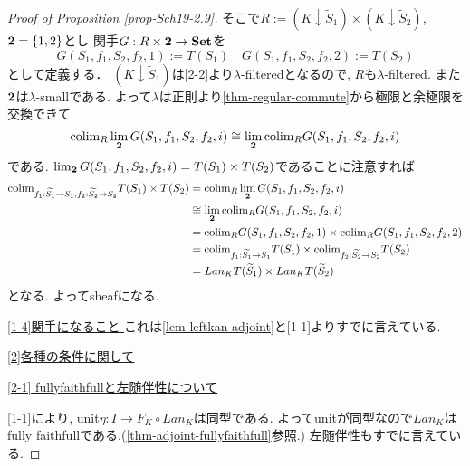 \documentclass[dvipdfmx,a4paper,11pt]{article}
\newcommand{\colim}{{\rm colim}}
\theoremstyle{definition}
\begin{document}
\begin{proof}[Proof of Proposition \ref{prop-Sch19-2.9}]
そこで$R := (K \downarrow  \widetilde{S}_1) \times (K \downarrow  \widetilde{S}_2) $, ${\bf 2}=\{ 1,2\}$とし
関手$G : R \times {\bf 2} \to {\bf Set}$を
$$G(S_1, f_1, S_2, f_2, 1) := T(S_1)
\quad
G(S_1, f_1, S_2, f_2, 2) := T(S_2)
$$
として定義する．
$(K \downarrow  \widetilde{S}_1) $は[2-2]より$\lambda$-filteredとなるので, $R$も$\lambda$-filtered. 
また${\bf 2}$は$\lambda$-smallである. 
よって$\lambda$は正則より\ref{thm-regular-commute}から極限と余極限を交換できて
$$
\colim_{R} \lim_{{\bf2}}G(S_1, f_1, S_2, f_2, i)
\cong 
\lim_{{\bf2}}\colim_{R} G(S_1, f_1, S_2, f_2, i)
$$
である. 
$\lim_{{\bf2}}G(S_1, f_1, S_2, f_2, i) =T(S_1) \times T(S_2)$であることに注意すれば
\begin{align*}
\begin{split}
\colim_{f_1 : \widetilde{S_1} \to S_1,  f_2 : \widetilde{S_2} \to S_2} T(S_1) \times  T( S_2)
&=\colim_{R} \lim_{{\bf2}}G(S_1, f_1, S_2, f_2, i)\\
& \cong \lim_{{\bf2}}\colim_{R} G(S_1, f_1, S_2, f_2, i) \\
&= \colim_{R} G(S_1, f_1, S_2, f_2, 1)  \times \colim_{R} G(S_1, f_1, S_2, f_2, 2) \\
&=\colim_{f_1 : \widetilde{S_1} \to S_1 } T(S_1) \times  \colim_{ f_2 : \widetilde{S_2} \to S_2}T( S_2) \\
&= Lan_{K}T(\widetilde{S}_1) \times Lan_{K}T(\widetilde{S}_2) 
\end{split}
\end{align*}
となる. 
よってsheafになる. 

\underline{[1-4]関手になること } 
これは\ref{lem-leftkan-adjoint}と[1-1]よりすでに言えている. 

\vspace{5pt}
\underline{[2]各種の条件に関して}

\underline{[2-1] fullyfaithfullと左随伴性について}

[1-1]により, unit$\eta : I \to  F_{K} \circ Lan_{K} $は同型である. 
よってunitが同型なので$Lan_{K}$はfully faithfullである.(\ref{thm-adjoint-fullyfaithfull}参照.)
左随伴性もすでに言えている. 


\end{proof}
\end{document}
